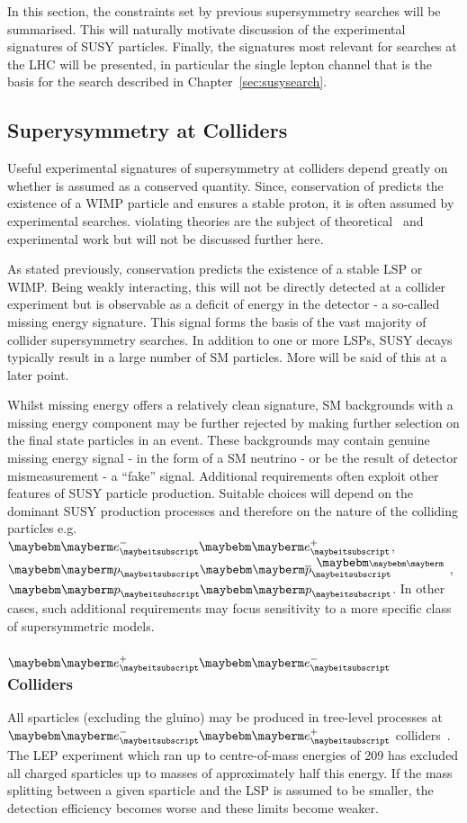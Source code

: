 In this section, the constraints set by previous supersymmetry searches will be
summarised. This will naturally motivate discussion of the experimental
signatures of \ac{SUSY} particles. Finally, the signatures most relevant for
searches at the \ac{LHC} will be presented, in particular the single lepton
channel that is the basis for the search described in
Chapter~\ref{sec:susysearch}.

\subsection{Superysymmetry at Colliders}
Useful experimental signatures of supersymmetry at colliders depend greatly on
whether \Rparity is assumed as a conserved quantity. Since, conservation of
\Rparity predicts the existence of a \ac{WIMP} particle and ensures a stable
proton, it is often assumed by experimental searches. \Rparity violating
theories are the subject of theoretical~\cite{aulakh_rpv} and experimental work
but will not be discussed further here.

As stated previously, \Rparity conservation predicts the existence of a stable
\ac{LSP} or \ac{WIMP}. Being weakly interacting, this will not be directly
detected at a collider experiment but is observable as a deficit of energy in
the detector - a so-called missing energy signature. This signal forms the basis
of the vast majority of collider supersymmetry searches. In addition to one or
more \acp{LSP}, \ac{SUSY} decays typically result in a large number of \ac{SM}
particles. More will be said of this at a later point.

Whilst missing energy offers a relatively clean signature, \ac{SM} backgrounds
with a missing energy component may be further rejected by making further
selection on the final state particles in an event. These backgrounds may
contain genuine missing energy signal - in the form of a \ac{SM} neutrino - or
be the result of detector mismeasurement - a ``fake'' signal. Additional
requirements often exploit other features of \ac{SUSY} particle
production. Suitable choices will depend on the dominant \ac{SUSY} production
processes and therefore on the nature of the colliding particles
e.g. $\Pelectron\APelectron$, $\Pproton\APproton$, $\Pproton\Pproton$. In other
cases, such additional requirements may focus sensitivity to a more specific
class of supersymmetric models.

\subsubsection{$\APelectron\Pelectron$ Colliders}
All sparticles (excluding the gluino) may be produced in tree-level processes at
$\Pelectron\APelectron$ colliders~\cite{susy_primer}. The \ac{LEP} experiment
which ran up to centre-of-mass energies of \unit{209}{\GeV} has excluded all
charged sparticles up to masses of approximately half this energy. If the mass
splitting between a given sparticle and the \ac{LSP} is assumed to be smaller,
the detection efficiency becomes worse and these limits become weaker.

